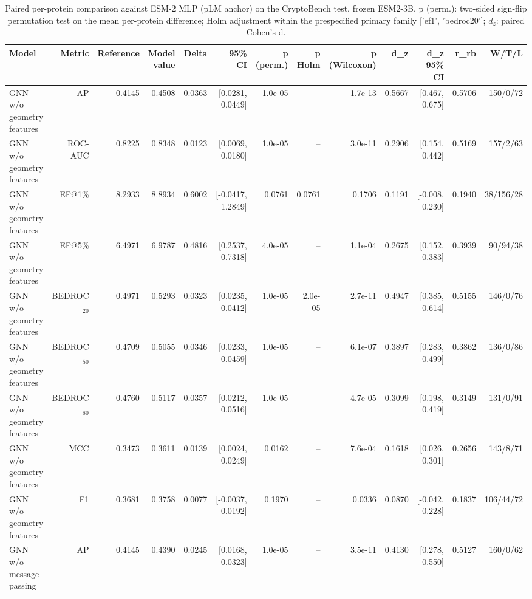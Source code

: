 \begin{table}[t]
\centering
\small
\caption{Paired per-protein comparison against ESM-2 MLP (pLM anchor) on the CryptoBench test, frozen ESM2-3B. p (perm.): two-sided sign-flip permutation test on the mean per-protein difference; Holm adjustment within the prespecified primary family ['ef1', 'bedroc20']; $d_z$: paired Cohen's d.}
\label{tab:table_paired_vs_base_plm}
\begin{tabular}{lrrrrrrrrrrrr}
\toprule
Model & Metric & Reference & Model value & Delta & 95\% CI & p (perm.) & p Holm & p (Wilcoxon) & d\_z & d\_z 95\% CI & r\_rb & W/T/L \\
\midrule
GNN w/o geometry features & AP & 0.4145 & 0.4508 & 0.0363 & [0.0281, 0.0449] & 1.0e-05 & -- & 1.7e-13 & 0.5667 & [0.467, 0.675] & 0.5706 & 150/0/72 \\
GNN w/o geometry features & ROC-AUC & 0.8225 & 0.8348 & 0.0123 & [0.0069, 0.0180] & 1.0e-05 & -- & 3.0e-11 & 0.2906 & [0.154, 0.442] & 0.5169 & 157/2/63 \\
GNN w/o geometry features & EF@1\% & 8.2933 & 8.8934 & 0.6002 & [-0.0417, 1.2849] & 0.0761 & 0.0761 & 0.1706 & 0.1191 & [-0.008, 0.230] & 0.1940 & 38/156/28 \\
GNN w/o geometry features & EF@5\% & 6.4971 & 6.9787 & 0.4816 & [0.2537, 0.7318] & 4.0e-05 & -- & 1.1e-04 & 0.2675 & [0.152, 0.383] & 0.3939 & 90/94/38 \\
GNN w/o geometry features & BEDROC$_{20}$ & 0.4971 & 0.5293 & 0.0323 & [0.0235, 0.0412] & 1.0e-05 & 2.0e-05 & 2.7e-11 & 0.4947 & [0.385, 0.614] & 0.5155 & 146/0/76 \\
GNN w/o geometry features & BEDROC$_{50}$ & 0.4709 & 0.5055 & 0.0346 & [0.0233, 0.0459] & 1.0e-05 & -- & 6.1e-07 & 0.3897 & [0.283, 0.499] & 0.3862 & 136/0/86 \\
GNN w/o geometry features & BEDROC$_{80}$ & 0.4760 & 0.5117 & 0.0357 & [0.0212, 0.0516] & 1.0e-05 & -- & 4.7e-05 & 0.3099 & [0.198, 0.419] & 0.3149 & 131/0/91 \\
GNN w/o geometry features & MCC & 0.3473 & 0.3611 & 0.0139 & [0.0024, 0.0249] & 0.0162 & -- & 7.6e-04 & 0.1618 & [0.026, 0.301] & 0.2656 & 143/8/71 \\
GNN w/o geometry features & F1 & 0.3681 & 0.3758 & 0.0077 & [-0.0037, 0.0192] & 0.1970 & -- & 0.0336 & 0.0870 & [-0.042, 0.228] & 0.1837 & 106/44/72 \\
GNN w/o message passing & AP & 0.4145 & 0.4390 & 0.0245 & [0.0168, 0.0323] & 1.0e-05 & -- & 3.5e-11 & 0.4130 & [0.278, 0.550] & 0.5127 & 160/0/62 \\

\end{tabular}
\end{table}
